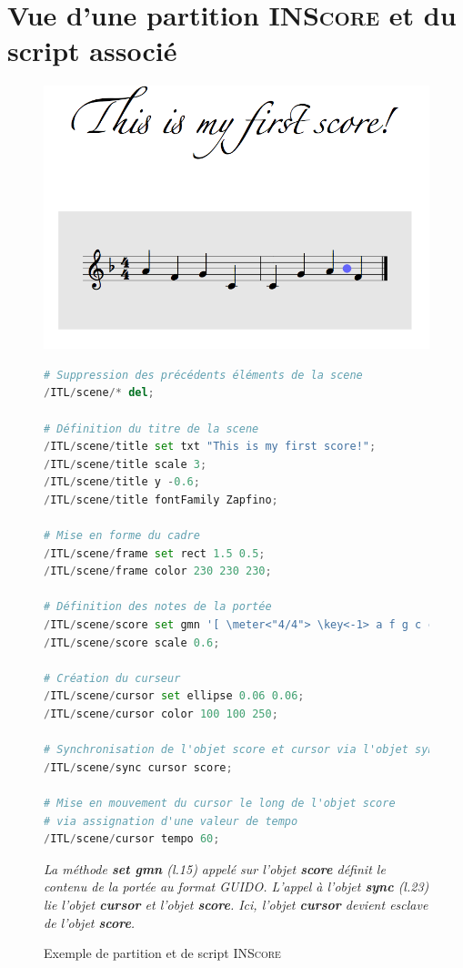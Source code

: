 \section{Vue d'une partition \textsc{INScore} et du script associé}
\label{sec:exempleINScore}
\begin{figure}[H]
	\centering
	\includegraphics[keepaspectratio=true, width=\textwidth]{Annexes/i/exempleINScore.png}
	\begin{lstlisting}[language = python, linewidth = \textwidth]
# Suppression des précédents éléments de la scene
/ITL/scene/* del;

# Définition du titre de la scene
/ITL/scene/title set txt "This is my first score!";
/ITL/scene/title scale 3;
/ITL/scene/title y -0.6;
/ITL/scene/title fontFamily Zapfino;

# Mise en forme du cadre 
/ITL/scene/frame set rect 1.5 0.5;
/ITL/scene/frame color 230 230 230;

# Définition des notes de la portée
/ITL/scene/score set gmn '[ \meter<"4/4"> \key<-1> a f g c c g a f ]';
/ITL/scene/score scale 0.6;

# Création du curseur
/ITL/scene/cursor set ellipse 0.06 0.06;
/ITL/scene/cursor color 100 100 250;

# Synchronisation de l'objet score et cursor via l'objet sync
/ITL/scene/sync cursor score;

# Mise en mouvement du cursor le long de l'objet score
# via assignation d'une valeur de tempo
/ITL/scene/cursor tempo 60; 
	\end{lstlisting}
	\caption{Exemple de partition et de script \textsc{INScore}}
	\medskip
	\small
	\it
	La méthode \textbf{set gmn} (l.15) appelé sur l'objet \textbf{score} définit le contenu de la portée au format GUIDO. L'appel à l'objet \textbf{sync} (l.23) lie l'objet \textbf{cursor} et l'objet \textbf{score}. Ici, l'objet \textbf{cursor} devient esclave de l'objet \textbf{score}.  	
	\label{fig:exempleINScore}
\end{figure}

